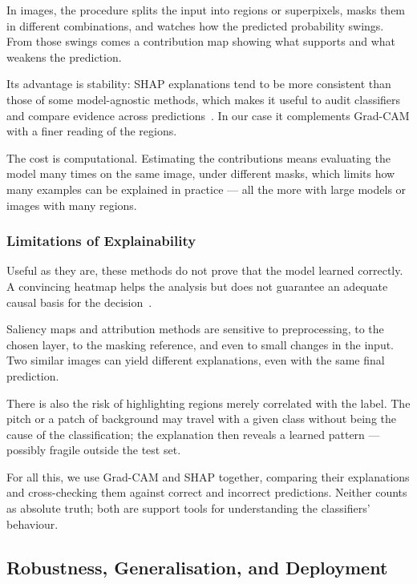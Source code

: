 \documentclass[preprint,12pt]{elsarticle}
\begin{document}
In images, the procedure splits the input into regions or superpixels, masks them in different combinations, and watches how the predicted probability swings. From those swings comes a contribution map showing what supports and what weakens the prediction.

Its advantage is stability: SHAP explanations tend to be more consistent than those of some model-agnostic methods, which makes it useful to audit classifiers and compare evidence across predictions~\cite{aldughayfiq2023retinoblastoma,schorr2023interpretability}. In our case it complements Grad-CAM with a finer reading of the regions.

The cost is computational. Estimating the contributions means evaluating the model many times on the same image, under different masks, which limits how many examples can be explained in practice --- all the more with large models or images with many regions.

\subsubsection{Limitations of Explainability}

Useful as they are, these methods do not prove that the model learned correctly. A convincing heatmap helps the analysis but does not guarantee an adequate causal basis for the decision~\cite{nazir2023survey}.

Saliency maps and attribution methods are sensitive to preprocessing, to the chosen layer, to the masking reference, and even to small changes in the input. Two similar images can yield different explanations, even with the same final prediction.

There is also the risk of highlighting regions merely correlated with the label. The pitch or a patch of background may travel with a given class without being the cause of the classification; the explanation then reveals a learned pattern --- possibly fragile outside the test set.

For all this, we use Grad-CAM and SHAP together, comparing their explanations and cross-checking them against correct and incorrect predictions. Neither counts as absolute truth; both are support tools for understanding the classifiers' behaviour.

\subsection{Robustness, Generalisation, and Deployment}
\end{document}
